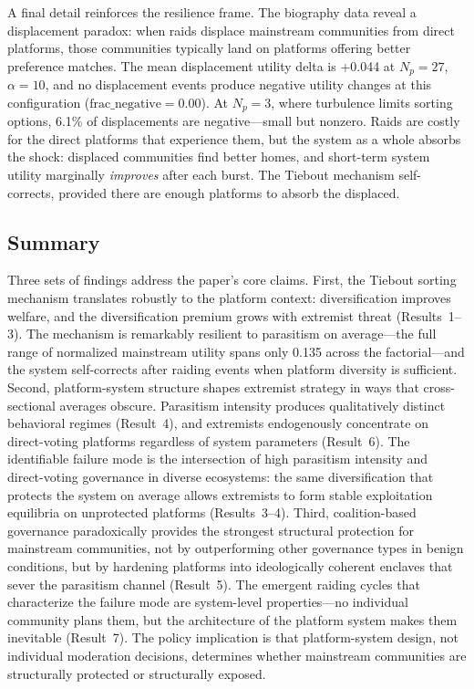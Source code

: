A final detail reinforces the resilience frame. The biography data reveal a displacement paradox: when raids displace mainstream communities from direct platforms, those communities typically land on platforms offering better preference matches. The mean displacement utility delta is +0.044 at $N_p = 27$, $\alpha = 10$, and no displacement events produce negative utility changes at this configuration ($\text{frac\_negative} = 0.00$). At $N_p = 3$, where turbulence limits sorting options, 6.1\% of displacements are negative---small but nonzero. Raids are costly for the direct platforms that experience them, but the system as a whole absorbs the shock: displaced communities find better homes, and short-term system utility marginally \textit{improves} after each burst. The Tiebout mechanism self-corrects, provided there are enough platforms to absorb the displaced.

\subsection{Summary}
\label{sec:results_summary}

Three sets of findings address the paper's core claims. First, the Tiebout sorting mechanism translates robustly to the platform context: diversification improves welfare, and the diversification premium grows with extremist threat (Results~1--3). The mechanism is remarkably resilient to parasitism on average---the full range of normalized mainstream utility spans only 0.135 across the factorial---and the system self-corrects after raiding events when platform diversity is sufficient. Second, platform-system structure shapes extremist strategy in ways that cross-sectional averages obscure. Parasitism intensity produces qualitatively distinct behavioral regimes (Result~4), and extremists endogenously concentrate on direct-voting platforms regardless of system parameters (Result~6). The identifiable failure mode is the intersection of high parasitism intensity and direct-voting governance in diverse ecosystems: the same diversification that protects the system on average allows extremists to form stable exploitation equilibria on unprotected platforms (Results~3--4). Third, coalition-based governance paradoxically provides the strongest structural protection for mainstream communities, not by outperforming other governance types in benign conditions, but by hardening platforms into ideologically coherent enclaves that sever the parasitism channel (Result~5). The emergent raiding cycles that characterize the failure mode are system-level properties---no individual community plans them, but the architecture of the platform system makes them inevitable (Result~7). The policy implication is that platform-system design, not individual moderation decisions, determines whether mainstream communities are structurally protected or structurally exposed.
